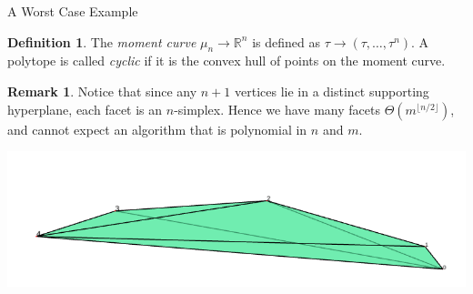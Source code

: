 \documentclass[9pt]{beamer}
\theoremstyle{definition}
\newtheorem{remark}{Remark}
\newtheorem{defn}{Definition}
\begin{document}
\begin{frame}[fragile]{A Worst Case Example}
  \begin{defn}
    The \emph{moment curve} $\mu_n \to \mathbb{R}^n$ is defined as
    $\tau \to (\tau, \dots, \tau^n)$. A polytope is called \emph{cyclic}
    if it is the convex hull of points on the moment curve.
  \end{defn}
    
  \begin{remark}
    Notice that since any $n + 1$ vertices lie in a distinct supporting
    hyperplane, each facet is an $n$-simplex. Hence we have many facets $\Theta(m^{\lfloor n / 2 \rfloor })$, and cannot expect an algorithm that is polynomial in $n$ and $m$.
  
  \end{remark}

  \begin{center}
    \includegraphics[width=.30\textwidth, height=0.4\textheight]{images/cyclic}
  \end{center}
\end{frame}
\end{document}
